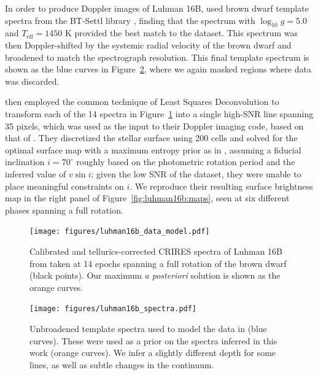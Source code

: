 \documentclass[modern]{aastex631}
\begin{document}
In order to produce Doppler images of Luhman 16B, \citet{Crossfield2014} used brown dwarf template spectra from the BT-Settl library \citep{Allard2013}, finding that the spectrum with $\log_{10} g = 5.0$ and $T_\mathrm{eff} = 1450$ K provided the best match to the dataset.
This spectrum was then Doppler-shifted by the systemic radial velocity of the brown dwarf and broadened to match the spectrograph resolution.
This final template spectrum is shown as the blue curves in Figure~\ref{fig:luhman16b:template_spectra}, where we again masked regions where data was discarded.

\citet{Crossfield2014} then employed the common technique of Least Squares Deconvolution \citep[LSD;][]{Donati1997} to transform each of the 14 spectra in Figure~\ref{fig:luhman16b:data_model} into a single high-SNR line spanning 35 pixels, which was used as the input to their Doppler imaging code, based on that of \citet{Vogt1987}.
They discretized the stellar surface using 200 cells and solved for the optimal surface map with a maximum entropy prior as in \citet{Vogt1987}, assuming a fiducial inclination $i=70^\circ$ roughly based on the photometric rotation period and the inferred value of $v\sin i$; given the low SNR of the dataset, they were unable to place meaningful constraints on $i$.
We reproduce their resulting surface brightness map in the right panel of Figure~\ref{fig:luhman16b:maps}, seen at six different phases spanning a full rotation.

\begin{figure}[p!]
    \begin{centering}
        \texttt{[image: figures/luhman16b\_data\_model.pdf]} %
        \caption{%
            Calibrated and tellurics-corrected CRIRES spectra of Luhman 16B from \citet{Crossfield2014} taken at 14 epochs spanning a full rotation of the brown dwarf (black points).
            Our maximum \emph{a posteriori} solution is shown as the orange curves.
        }
        \label{fig:luhman16b:data_model}
    \end{centering}
\end{figure}
%
\begin{figure}[p!]
    \begin{centering}
        \texttt{[image: figures/luhman16b\_spectra.pdf]} %
        \caption{%
            Unbroadened template spectra used to model the data in \citet{Crossfield2014} (blue curves). 
            These were used as a prior on the spectra inferred in this work (orange curves). 
            We infer a slightly different depth for some lines, as well as subtle changes in the continuum.
        }
        \label{fig:luhman16b:template_spectra}
    \end{centering}
\end{figure}
\end{document}
